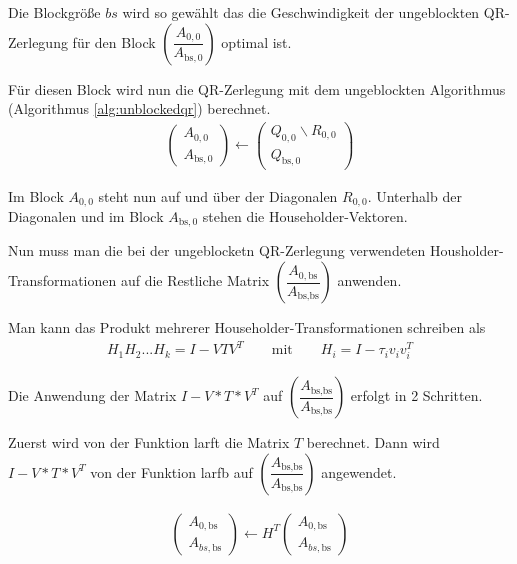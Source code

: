 Die Blockgröße $bs$ wird so gewählt das die Geschwindigkeit der ungeblockten QR-Zerlegung für den Block $ \left(\dfrac{A_{0, 0}}{A_{\text{bs}, 0}} \right)$ optimal ist.

Für diesen Block wird nun die  QR-Zerlegung mit dem ungeblockten Algorithmus (Algorithmus \ref{alg:unblockedqr}) berechnet.
\begin{align}
	\left(\begin{array}{l} 
	A_{0, 0} \\ \hline
	A_{\text{bs}, 0}
	\end{array}\right)
	\leftarrow
	\left(\begin{array}{l} 
	Q_{0, 0}  \backslash R_{0,0} \\ \hline
	Q_{\text{bs}, 0} 
	\end{array}\right)
\end{align}

Im Block $A_{0, 0}$ steht nun auf und über der Diagonalen $R_{0,0}$. Unterhalb der Diagonalen und im Block $A_{\text{bs}, 0}$ stehen die Householder-Vektoren.

Nun muss man die bei der ungeblocketn QR-Zerlegung verwendeten Housholder-Transformationen auf die Restliche Matrix $ \left(\dfrac{A_{0, \text{bs}}}{A_{\text{bs}, \text{bs}}} \right)$ anwenden.



Man kann das Produkt mehrerer Householder-Transformationen schreiben als
\begin{align*}
H_1H_2...H_k = I - VTV^T \qquad \text{mit}\qquad H_i = I - \tau_i v_iv_i^T
\end{align*} \cite{Joffrain:2006:AHT:1141885.1141886}

Die Anwendung der Matrix $I - V*T*V^T$ auf $\left(\dfrac{A_{\text{bs}, \text{bs}}}{A_{\text{bs}, \text{bs}}} \right)$ erfolgt in 2 Schritten.

Zuerst wird von der Funktion \glqq larft \grqq{}  die Matrix $T$ berechnet.
Dann wird $I - V*T*V^T$ von der Funktion \glqq larfb\grqq{} auf $\left(\dfrac{A_{\text{bs}, \text{bs}}}{A_{\text{bs}, \text{bs}}} \right)$ angewendet.


\begin{align}
	\left(\begin{array}{l} 
	A_{0, \text{bs}} \\ \hline
	A_{bs, \text{bs}}
	\end{array}\right)
	\leftarrow
	H^T \left(\begin{array}{l} 
	A_{0, \text{bs}} \\ \hline
	A_{bs, \text{bs}}
	\end{array}\right)
\end{align}

